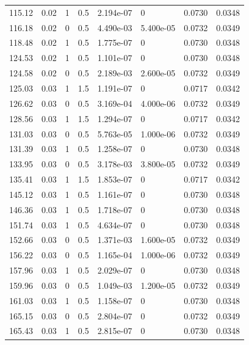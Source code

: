 \documentclass[preview]{standalone}
\begin{document}
{{\begin{tabular}{L{1.2cm}C{1.2cm} C{0.3cm}C{0.5cm} C{1.4cm}C{1.4cm} C{1.4cm}C{1.4cm}}
  115.12  &  0.02  & 1     & 0.5 &  2.194e-07  & 0  & 0.0730 &  0.0348   \\ 
  116.18  &  0.02  & 0     & 0.5 &  4.490e-03  & 5.400e-05  & 0.0732 &  0.0349   \\ 
  118.48  &  0.02  & 1     & 0.5 &  1.775e-07  & 0  & 0.0730 &  0.0348   \\ 
  124.53  &  0.02  & 1     & 0.5 &  1.101e-07  & 0  & 0.0730 &  0.0348   \\ 
  124.58  &  0.02  & 0     & 0.5 &  2.189e-03  & 2.600e-05  & 0.0732 &  0.0349   \\ 
  125.03  &  0.03  & 1     & 1.5 &  1.191e-07  & 0  & 0.0717 &  0.0342   \\ 
  126.62  &  0.03  & 0     & 0.5 &  3.169e-04  & 4.000e-06  & 0.0732 &  0.0349   \\ 
  128.56  &  0.03  & 1     & 1.5 &  1.294e-07  & 0  & 0.0717 &  0.0342   \\ 
  131.03  &  0.03  & 0     & 0.5 &  5.763e-05  & 1.000e-06  & 0.0732 &  0.0349   \\ 
  131.39  &  0.03  & 1     & 0.5 &  1.258e-07  & 0  & 0.0730 &  0.0348   \\ 
  133.95  &  0.03  & 0     & 0.5 &  3.178e-03  & 3.800e-05  & 0.0732 &  0.0349   \\ 
  135.41  &  0.03  & 1     & 1.5 &  1.853e-07  & 0  & 0.0717 &  0.0342   \\ 
  145.12  &  0.03  & 1     & 0.5 &  1.161e-07  & 0  & 0.0730 &  0.0348   \\ 
  146.36  &  0.03  & 1     & 0.5 &  1.718e-07  & 0  & 0.0730 &  0.0348   \\ 
  151.74  &  0.03  & 1     & 0.5 &  4.634e-07  & 0  & 0.0730 &  0.0348   \\ 
  152.66  &  0.03  & 0     & 0.5 &  1.371e-03  & 1.600e-05  & 0.0732 &  0.0349   \\ 
  156.22  &  0.03  & 0     & 0.5 &  1.165e-04  & 1.000e-06  & 0.0732 &  0.0349   \\ 
  157.96  &  0.03  & 1     & 0.5 &  2.029e-07  & 0  & 0.0730 &  0.0348   \\ 
  159.96  &  0.03  & 0     & 0.5 &  1.049e-03  & 1.200e-05  & 0.0732 &  0.0349   \\ 
  161.03  &  0.03  & 1     & 0.5 &  1.158e-07  & 0  & 0.0730 &  0.0348   \\ 
  165.15  &  0.03  & 0     & 0.5 &  2.804e-07  & 0  & 0.0732 &  0.0349   \\ 
  165.43  &  0.03  & 1     & 0.5 &  2.815e-07  & 0  & 0.0730 &  0.0348   \\ 

\end{tabular}}}
\end{document}
